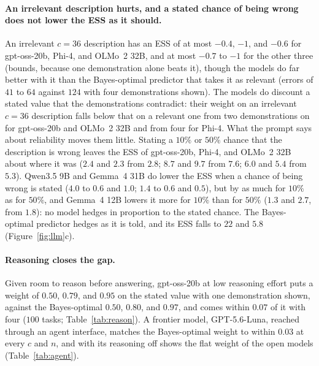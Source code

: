 \documentclass{article}
\begin{document}
\paragraph{An irrelevant description hurts, and a stated chance of being wrong does not lower the ESS as it should.} An irrelevant $c = 36$ description has an ESS of at most $-0.4$, $-1$, and $-0.6$ for gpt-oss-20b, Phi-4, and OLMo~2 32B, and at most $-0.7$ to $-1$ for the other three (bounds, because one demonstration alone beats it), though the models do far better with it than the Bayes-optimal predictor that takes it as relevant (errors of $41$ to $64$ against $124$ with four demonstrations shown). The models do discount a stated value that the demonstrations contradict: their weight on an irrelevant $c = 36$ description falls below that on a relevant one from two demonstrations on for gpt-oss-20b and OLMo~2 32B and from four for Phi-4. What the prompt says about reliability moves them little. Stating a $10\%$ or $50\%$ chance that the description is wrong leaves the ESS of gpt-oss-20b, Phi-4, and OLMo~2 32B about where it was ($2.4$ and $2.3$ from $2.8$; $8.7$ and $9.7$ from $7.6$; $6.0$ and $5.4$ from $5.3$). Qwen3.5 9B and Gemma~4 31B do lower the ESS when a chance of being wrong is stated ($4.0$ to $0.6$ and $1.0$; $1.4$ to $0.6$ and $0.5$), but by as much for $10\%$ as for $50\%$, and Gemma~4 12B lowers it more for $10\%$ than for $50\%$ ($1.3$ and $2.7$, from $1.8$): no model hedges in proportion to the stated chance. The Bayes-optimal predictor hedges as it is told, and its ESS falls to $22$ and $5.8$ (Figure~\ref{fig:llm}c).

\paragraph{Reasoning closes the gap.} Given room to reason before answering, gpt-oss-20b at low reasoning effort puts a weight of $0.50$, $0.79$, and $0.95$ on the stated value with one demonstration shown, against the Bayes-optimal $0.50$, $0.80$, and $0.97$, and comes within $0.07$ of it with four ($100$ tasks; Table~\ref{tab:reason}). A frontier model, GPT-5.6-Luna, reached through an agent interface, matches the Bayes-optimal weight to within $0.03$ at every $c$ and $n$, and with its reasoning off shows the flat weight of the open models (Table~\ref{tab:agent}).
\end{document}
